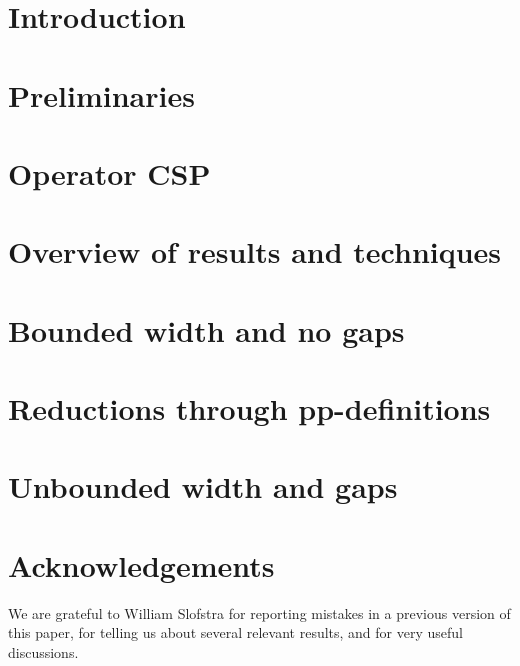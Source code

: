 \documentclass[11pt,letter]{article}
\begin{document}
\section{Introduction}



\section{Preliminaries}\label{sec:preliminaries}



\section{Operator CSP}\label{sec:operator-CSP}




\section{Overview of results and techniques}




\section{Bounded width and no gaps}\label{sec:no-gap}



\section{Reductions through pp-definitions}\label{sec:operator-pp}




\section{Unbounded width and gaps}\label{sec:gap}



\section*{Acknowledgements} We are grateful to William Slofstra for reporting
mistakes in a previous version of this paper, for telling us about several
relevant results, and for very useful discussions.

{\small


}
\end{document}
